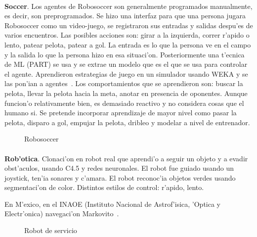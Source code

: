 \documentclass[11pt]{article}
\begin{document}
\paragraph{}
\noindent
\textbf{Soccer}. Los agentes de Robosoccer son generalmente programados manualmente, es decir, son preprogramados. Se hizo una interfaz para que una persona jugara Robosoccer como un video-juego, se registraron sus entradas y salidas despu'es de varios encuentros. Las posibles acciones son: girar a la izquierda, correr r'apido o lento, patear pelota, patear a gol. La entrada es lo que la persona ve en el campo y la salida lo que la persona hizo en esa situaci'on. Posteriormente una t'ecnica de ML (PART) se usa y se extrae un modelo que es el que se usa para controlar el agente. Aprendieron estrategias de juego en un simulador usando WEKA y se las pon'ian a agentes~\cite{soccerAler}. Los comportamientos que se aprendieron son: buscar la pelota, llevar la pelota hacia la meta, anotar en presencia de oponentes. Aunque funcion'o relativamente bien, es demasiado reactivo y no considera cosas que el humano si. Se pretende incorporar aprendizaje de mayor nivel como pasar la pelota, disparo a gol, empujar la pelota, dribleo y modelar a nivel de entrenador.

\begin{figure}[h]

\centering
{}
\caption[Robosoccer]{Robosoccer} 
\label{fig:robosoc}

\end{figure}


\paragraph{}
\noindent
\textbf{Rob'otica}. Clonaci'on en robot real que aprendi'o a seguir un objeto y a evadir obst'aculos, usando C4.5 y redes neuronales. El robot fue guiado usando un joystick, ten'ia sonares y c'amara. El robot reconoc'ia objetos verdes usando segmentaci'on de color. Distintos estilos de control: r'apido, lento. 

En M'exico, en el INAOE (Instituto Nacional de Astrof'isica, 'Optica y Electr'onica) navegaci'on Markovito~\cite{rljulioed, trps:icm09,mkvito:ieee}.


\begin{figure}[h]
\begin{center}

\caption{Robot de servicio}
  \label{fig:robotservicio}
\end{center}
\end{figure} 
\end{document}

